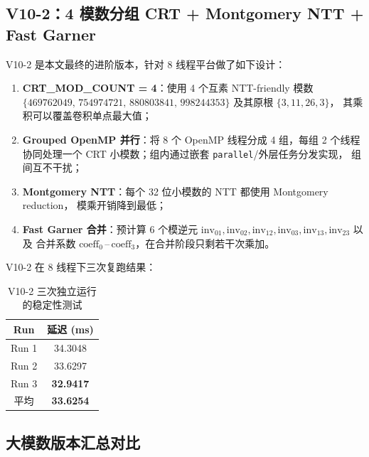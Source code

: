 \documentclass[UTF8,a4paper,10pt]{ctexart}
\begin{document}
\subsection{V10-2：4 模数分组 CRT + Montgomery NTT + Fast Garner}

V10-2 是本文最终的进阶版本，针对 8 线程平台做了如下设计：

\begin{enumerate}
  \item \textbf{CRT\_MOD\_COUNT = 4}：使用 4 个互素 NTT-friendly 模数
        $\{469762049,\, 754974721,\, 880803841,\, 998244353\}$ 及其原根 $\{3, 11, 26, 3\}$，
        其乘积可以覆盖卷积单点最大值；
  \item \textbf{Grouped OpenMP 并行}：将 8 个 OpenMP 线程分成 4 组，每组 2 个线程
        协同处理一个 CRT 小模数；组内通过嵌套 \texttt{parallel}/外层任务分发实现，
        组间互不干扰；
  \item \textbf{Montgomery NTT}：每个 32 位小模数的 NTT 都使用 Montgomery reduction，
        模乘开销降到最低；
  \item \textbf{Fast Garner 合并}：预计算 6 个模逆元 $\mathrm{inv}_{01}, \mathrm{inv}_{02},
        \mathrm{inv}_{12}, \mathrm{inv}_{03}, \mathrm{inv}_{13}, \mathrm{inv}_{23}$ 以及
        合并系数 $\mathrm{coeff}_0$\,--\,$\mathrm{coeff}_3$，在合并阶段只剩若干次乘加。
\end{enumerate}

V10-2 在 8 线程下三次复跑结果：

\begin{table}[H]
  \centering
  \begin{tabular}{cc}
  \toprule  
  \textbf{Run} & \textbf{延迟 (ms)}\\
  \midrule
  Run 1 & 34.3048 \\
  Run 2 & 33.6297 \\
  Run 3 & \textbf{32.9417} \\
  \midrule
  平均  & \textbf{33.6254} \\
  \bottomrule
  \end{tabular}
  \caption{V10-2 三次独立运行的稳定性测试}
  \label{tab:v10-stability}
\end{table}

\subsection{大模数版本汇总对比}
\end{document}
